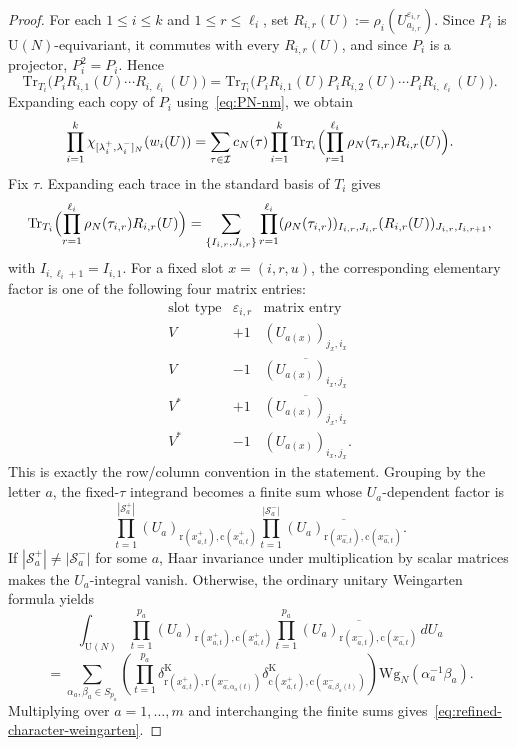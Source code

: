 \documentclass[11pt,a4paper,reqno]{article}
\theoremstyle{definition}
\theoremstyle{remark}
\newcommand\U{{\mathrm U}}
\newcommand\Tr{\mathrm{Tr}}
\begin{document}
\begin{proof}
For each $1\leq i\leq k$ and $1\leq r\leq \ell_i$, set $R_{i,r}(U):=\rho_i(U_{a_{i,r}}^{\varepsilon_{i,r}})$. Since $P_i$ is $\U(N)$-equivariant, it commutes with every $R_{i,r}(U)$, and since $P_i$ is a projector, $P_i^2=P_i$. Hence
\[
\Tr_{T_i}\bigl(P_i R_{i,1}(U)\cdots R_{i,\ell_i}(U)\bigr)=\Tr_{T_i}\bigl(P_iR_{i,1}(U)P_iR_{i,2}(U)\cdots P_iR_{i,\ell_i}(U)\bigr).
\]
Expanding each copy of $P_i$ using~\eqref{eq:PN-nm}, we obtain
\[
\prod_{i=1}^k \chi_{[\lambda_i^+,\lambda_i^-]_N}(w_i(U))=\sum_{\tau\in\mathcal I}c_N(\tau)\prod_{i=1}^k\Tr_{T_i}\Bigl(\prod_{r=1}^{\ell_i}\rho_N(\tau_{i,r})R_{i,r}(U)\Bigr).
\]
Fix $\tau$. Expanding each trace in the standard basis of $T_i$ gives
\[
\Tr_{T_i}\Bigl(\prod_{r=1}^{\ell_i}\rho_N(\tau_{i,r})R_{i,r}(U)\Bigr)
=\sum_{\{I_{i,r},J_{i,r}\}}\prod_{r=1}^{\ell_i}(\rho_N(\tau_{i,r}))_{I_{i,r},J_{i,r}}(R_{i,r}(U))_{J_{i,r},I_{i,r+1}},
\]
with $I_{i,\ell_i+1}=I_{i,1}$. For a fixed slot $x=(i,r,u)$, the corresponding elementary factor is one of the following four matrix entries:
\[
\begin{array}{c|c|c}
\text{slot type}&\varepsilon_{i,r}&\text{matrix entry}\\ \hline
V&+1&(U_{a(x)})_{j_x,i_x}\\
V&-1&\overline{(U_{a(x)})_{i_x,j_x}}\\
V^*&+1&\overline{(U_{a(x)})_{j_x,i_x}}\\
V^*&-1&(U_{a(x)})_{i_x,j_x}.
\end{array}
\]
This is exactly the row/column convention in the statement. Grouping by the letter $a$, the fixed-$\tau$ integrand becomes a finite sum whose $U_a$-dependent factor is
\[
\prod_{t=1}^{|\mathcal S_a^+|}(U_a)_{\mathrm r(x_{a,t}^+),\mathrm c(x_{a,t}^+)}
\prod_{t=1}^{|\mathcal S_a^-|}\overline{(U_a)_{\mathrm r(x_{a,t}^-),\mathrm c(x_{a,t}^-)}}.
\]
If $|\mathcal S_a^+|\ne|\mathcal S_a^-|$ for some $a$, Haar invariance under multiplication by scalar matrices makes the $U_a$-integral vanish. Otherwise, the ordinary unitary Weingarten formula yields
\[
\int_{\U(N)}\prod_{t=1}^{p_a}(U_a)_{\mathrm r(x_{a,t}^+),\mathrm c(x_{a,t}^+)}
\prod_{t=1}^{p_a}\overline{(U_a)_{\mathrm r(x_{a,t}^-),\mathrm c(x_{a,t}^-)}}\,dU_a
\]
\[
=\sum_{\alpha_a,\beta_a\in S_{p_a}}\left(\prod_{t=1}^{p_a}
\delta^{\mathrm K}_{\mathrm r(x_{a,t}^+),\mathrm r(x_{a,\alpha_a(t)}^-)}
\delta^{\mathrm K}_{\mathrm c(x_{a,t}^+),\mathrm c(x_{a,\beta_a(t)}^-)}\right)\mathrm{Wg}_N(\alpha_a^{-1}\beta_a).
\]
Multiplying over $a=1,\dots,m$ and interchanging the finite sums gives~\eqref{eq:refined-character-weingarten}.
\end{proof}
\end{document}
